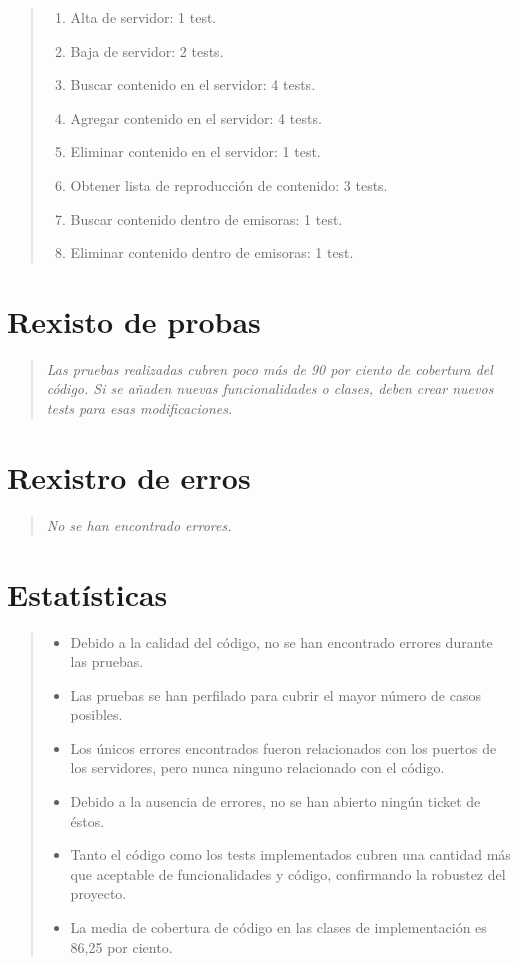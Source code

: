 \documentclass[DIV=calc,paper=a4,fontsize=11pt,onecolumn]{scrartcl}	 %
\newcommand{\hint}[1]{\begin{quote}\itshape #1 \end{quote}}
\begin{document}
\hint{ 
			\begin{enumerate}
				\item Alta de servidor: 1 test.
				\item Baja de servidor: 2 tests.
				\item Buscar contenido en el servidor: 4 tests.
				\item Agregar contenido en el servidor: 4 tests.
				\item Eliminar contenido en el servidor: 1 test.
				\item Obtener lista de reproducción de contenido: 3 tests.
				\item Buscar contenido dentro de emisoras: 1 test.
				\item Eliminar contenido dentro de emisoras: 1 test.
			\end{enumerate}
	}

\section{Rexisto de probas}

\hint{
	Las pruebas realizadas cubren poco más de 90 por ciento de cobertura del código. Si se añaden nuevas funcionalidades o clases, deben crear nuevos tests para esas modificaciones.
	}

\section{Rexistro de erros}

\hint{No se han encontrado errores.}

\section{Estatísticas}

\hint{
  \begin{itemize}
    \item Debido a la calidad del código, no se han encontrado errores durante las pruebas.
    \item Las pruebas se han perfilado para cubrir el mayor número de casos posibles.
    \item Los únicos errores encontrados fueron relacionados con los puertos de los servidores, pero nunca ninguno relacionado con el código.
    \item Debido a la ausencia de errores, no se han abierto ningún ticket de éstos.
    \item Tanto el código como los tests implementados cubren una cantidad más que aceptable de funcionalidades y código, confirmando la robustez del proyecto.
    \item La media de cobertura de código en las clases de implementación es 86,25 por ciento.
  \end{itemize}}
\end{document}

